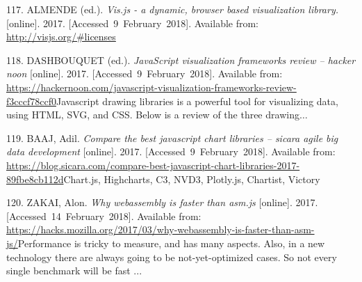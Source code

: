 \documentclass[american,a4paper,oneside,,tablecaptionabove]{scrbook}
\begin{document}
\hypertarget{ref-Almende.2017}{}
117. ALMENDE (ed.). \emph{Vis.js - a dynamic, browser based
visualization library.} {[}online{]}. 2017.
{[}Accessed~9~February~2018{]}. Available from:
\url{http://visjs.org/\#licenses}

\hypertarget{ref-DashBouquet.2017}{}
118. DASHBOUQUET (ed.). \emph{JavaScript visualization frameworks review
-- hacker noon} {[}online{]}. 2017. {[}Accessed~9~February~2018{]}.
Available from:
\url{https://hackernoon.com/javascript-visualization-frameworks-review-f3cccf78ccf0}Javascript
drawing libraries is a powerful tool for visualizing data, using HTML,
SVG, and CSS. Below is a review of the three drawing\(\ldots\)

\hypertarget{ref-Baaj.2017}{}
119. BAAJ, Adil. \emph{Compare the best javascript chart libraries --
sicara \textbar{} agile big data development} {[}online{]}. 2017.
{[}Accessed~9~February~2018{]}. Available from:
\url{https://blog.sicara.com/compare-best-javascript-chart-libraries-2017-89fbe8cb112d}Chart.js,
Highcharts, C3, NVD3, Plotly.js, Chartist, Victory

\hypertarget{ref-Zakai.2017}{}
120. ZAKAI, Alon. \emph{Why webassembly is faster than asm.js}
{[}online{]}. 2017. {[}Accessed~14~February~2018{]}. Available from:
\url{https://hacks.mozilla.org/2017/03/why-webassembly-is-faster-than-asm-js/}Performance
is tricky to measure, and has many aspects. Also, in a new technology
there are always going to be not-yet-optimized cases. So not every
single benchmark will be fast ...
\end{document}
